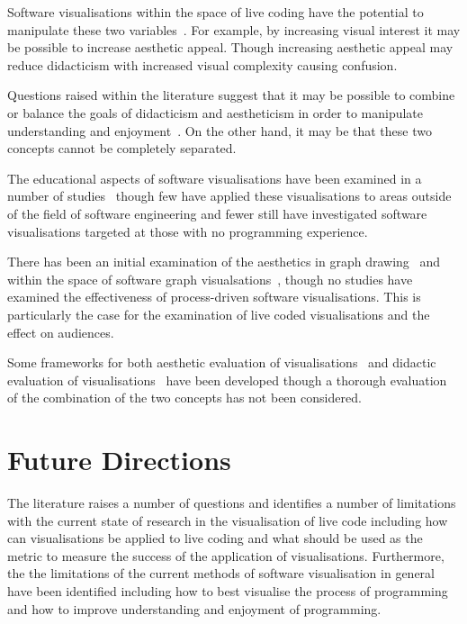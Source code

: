 
Software visualisations within the space of live coding have the potential to manipulate these two variables~\cite{Iru,McLean2010a}. For example, by increasing visual interest it may be possible to increase aesthetic appeal. Though increasing aesthetic appeal may reduce didacticism with increased visual complexity causing confusion.

Questions raised within the literature suggest that it may be possible to combine or balance the goals of didacticism and aestheticism in order to manipulate understanding and enjoyment~. On the other hand, it may be that these two concepts cannot be completely separated.

The educational aspects of software visualisations have been examined in a number of studies~ though few have applied these visualisations to areas outside of the field of software engineering and fewer still have investigated software visualisations targeted at those with no programming experience.

There has been an initial examination of the aesthetics in graph drawing~ and within the space of software graph visualsations~, though no studies have examined the effectiveness of process-driven software visualisations. This is particularly the case for the examination of live coded visualisations and the effect on audiences.

Some frameworks for both aesthetic evaluation of visualisations~\cite{Cawthon2007,Purchase1996} and didactic evaluation of visualisations~\cite{VanWijk2005} have been developed though a thorough evaluation of the combination of the two concepts has not been considered.

\section{Future Directions}

The literature raises a number of questions and identifies a number of limitations with the current state of research in the visualisation of live code including how can visualisations be applied to live coding and what should be used as the metric to measure the success of the application of visualisations. Furthermore, the the limitations of the current methods of software visualisation in general have been identified including how to best visualise the process of programming and how to improve understanding and enjoyment of programming.

